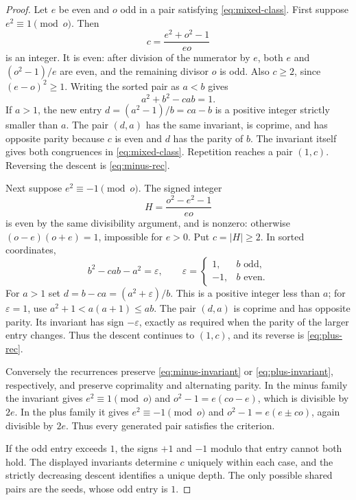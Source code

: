 \documentclass[11pt]{article}
\numberwithin{equation}{section}
\theoremstyle{definition}
\theoremstyle{remark}
\begin{document}
\begin{proof}
Let $e$ be even and $o$ odd in a pair satisfying
\eqref{eq:mixed-class}. First suppose $e^2\equiv1\pmod o$.
Then
\[
 c=\frac{e^2+o^2-1}{eo}
\]
is an integer. It is even: after division of the numerator by $e$, both
$e$ and $(o^2-1)/e$ are even, and the remaining divisor $o$ is odd.
Also $c\ge2$, since $(e-o)^2\ge1$. Writing the sorted pair as $a<b$
gives
\begin{equation}\label{eq:minus-invariant}
 a^2+b^2-cab=1.
\end{equation}
If $a>1$, the new entry
$d=(a^2-1)/b=ca-b$ is a positive integer strictly smaller than $a$.
The pair $(d,a)$ has the same invariant, is coprime, and has opposite
parity because $c$ is even and $d$ has the parity of $b$. The invariant
itself gives both congruences in \eqref{eq:mixed-class}. Repetition
reaches a pair $(1,c)$. Reversing the descent is
\eqref{eq:minus-rec}.

Next suppose $e^2\equiv-1\pmod o$. The signed integer
\[
 H=\frac{o^2-e^2-1}{eo}
\]
is even by the same divisibility argument, and is nonzero: otherwise
$(o-e)(o+e)=1$, impossible for $e>0$. Put $c=|H|\ge2$. In sorted
coordinates,
\begin{equation}\label{eq:plus-invariant}
 b^2-cab-a^2=\varepsilon,
 \qquad \varepsilon=\begin{cases}1,&b\text{ odd},\\-1,&b\text{ even}.
 \end{cases}
\end{equation}
For $a>1$ set
$d=b-ca=(a^2+\varepsilon)/b$. This is a positive integer less than
$a$; for $\varepsilon=1$, use $a^2+1<a(a+1)\le ab$. The pair
$(d,a)$ is coprime and has opposite parity. Its invariant has sign
$-\varepsilon$, exactly as required when the parity of the larger entry
changes. Thus the descent continues to $(1,c)$, and its reverse is
\eqref{eq:plus-rec}.

Conversely the recurrences preserve \eqref{eq:minus-invariant} or
\eqref{eq:plus-invariant}, respectively, and preserve coprimality and
alternating parity. In the minus family the invariant gives
$e^2\equiv1\pmod o$ and
$o^2-1=e(co-e)$, which is divisible by $2e$. In the plus family it
gives $e^2\equiv-1\pmod o$ and
$o^2-1=e(e\pm co)$, again divisible by $2e$. Thus every generated
pair satisfies the criterion.

If the odd entry exceeds $1$, the signs $+1$ and $-1$ modulo that
entry cannot both hold. The displayed invariants determine $c$
uniquely within each case, and the strictly decreasing descent
identifies a unique depth. The only possible shared pairs are the seeds,
whose odd entry is $1$.
\end{proof}
\end{document}
